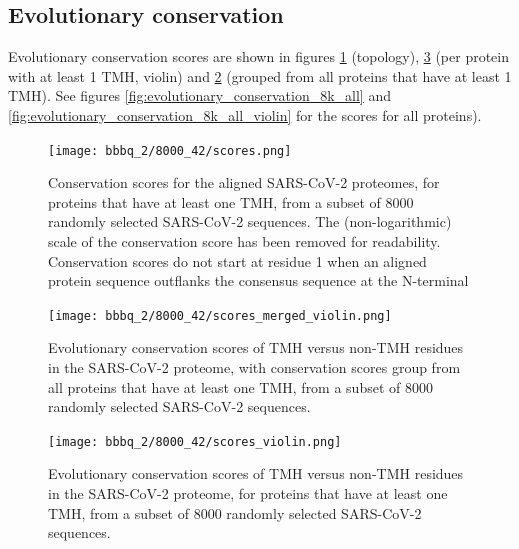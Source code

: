 \subsection{Evolutionary conservation}

Evolutionary conservation scores are shown in 
figures \ref{fig:evolutionary_conservation_8k} (topology),
\ref{fig:evolutionary_conservation_8k_violin} (per 
protein with at least 1 TMH, violin)
and \ref{fig:evolutionary_conservation_8k_merged} (grouped 
from all proteins that have at least 1 TMH).
See figures
\ref{fig:evolutionary_conservation_8k_all} and 
\ref{fig:evolutionary_conservation_8k_all_violin}
for the scores for all proteins).


\begin{figure}[!htbp]
  \texttt{[image: bbbq\_2/8000\_42/scores.png]}
  \caption{
    Conservation scores for the aligned SARS-CoV-2 proteomes,
    for proteins that have at least one TMH,
    from a subset of 8000 randomly selected SARS-CoV-2 sequences.
    The (non-logarithmic) scale of the conservation score has been removed
    for readability.
    Conservation scores do not start at residue 1 when
    an aligned protein sequence outflanks the consensus sequence 
    at the N-terminal
  }
  \label{fig:evolutionary_conservation_8k}
\end{figure}

\begin{figure}[!htbp]
  \texttt{[image: bbbq\_2/8000\_42/scores\_merged\_violin.png]}
  \caption{
    Evolutionary conservation scores of TMH versus non-TMH
    residues in the SARS-CoV-2 proteome,
    with conservation scores group from all proteins that have at least one TMH,
    from a subset of 8000 randomly selected SARS-CoV-2 sequences.
  }
  \label{fig:evolutionary_conservation_8k_merged}
\end{figure}

\begin{figure}[!htbp]
  \texttt{[image: bbbq\_2/8000\_42/scores\_violin.png]}
  \caption{
    Evolutionary conservation scores of TMH versus non-TMH
    residues in the SARS-CoV-2 proteome,
    for proteins that have at least one TMH,
    from a subset of 8000 randomly selected SARS-CoV-2 sequences.
  }
  \label{fig:evolutionary_conservation_8k_violin}
\end{figure}

